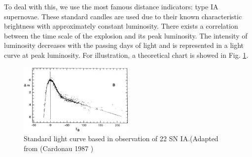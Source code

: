 \documentclass[aps,rmp,twocolumn,nofootinbib,superscriptaddress,floatfix,longbibliography]{revtex4-2}
\begin{document}
To deal with this, we use the most famous distance indicators: type IA supernovae. These standard candles are used due to their known characteristic brightness with approximately constant luminosity. There exists a correlation between the time scale of the explosion and its peak luminosity. The intensity of luminosity decreases with the passing days of light and is represented in a light curve at peak luminosity. For illustration, a theoretical chart is showed in
Fig. \ref{fig: Supernovae}.
\begin{figure}[h]
    \centering
    \includegraphics[width=0.5\textwidth]{Images/Supernovae.jpeg}
    \caption{Standard light curve based in observation of 22 SN IA.(Adapted from (Cardonau 1987 \cite{Supernovae_book})}
    \label{fig: Supernovae}
\end{figure}
\end{document}
